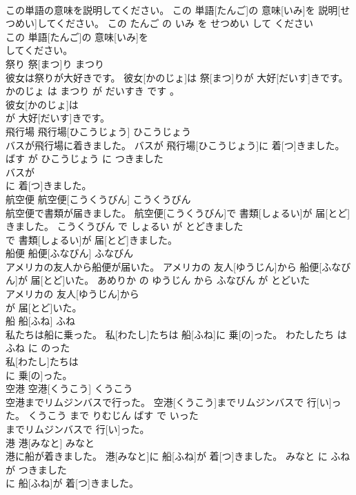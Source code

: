 \documentclass[8pt]{extreport}
\begin{document}
\begin{CJK}{UTF8}{min}
\\	この単語の意味を説明してください。	この 単語[たんご]の 意味[いみ]を 説明[せつめい]してください。	この たんご の いみ を せつめい して ください	
\\	この 単語[たんご]の 意味[いみ]を
\\	してください。			
\\	祭り	祭[まつ]り	まつり	
\\	彼女は祭りが大好きです。	彼女[かのじょ]は 祭[まつ]りが 大好[だいす]きです。	かのじょ は まつり が だいすき です 。	
\\	彼女[かのじょ]は
\\	が 大好[だいす]きです。			
\\	飛行場	飛行場[ひこうじょう]	ひこうじょう	
\\	バスが飛行場に着きました。	バスが 飛行場[ひこうじょう]に 着[つ]きました。	ばす が ひこうじょう に つきました	
\\	バスが
\\	に 着[つ]きました。			
\\	航空便	航空便[こうくうびん]	こうくうびん	
\\	航空便で書類が届きました。	航空便[こうくうびん]で 書類[しょるい]が 届[とど]きました。	こうくうびん で しょるい が とどきました	
\\	で 書類[しょるい]が 届[とど]きました。			
\\	船便	船便[ふなびん]	ふなびん	
\\	アメリカの友人から船便が届いた。	アメリカの 友人[ゆうじん]から 船便[ふなびん]が 届[とど]いた。	あめりか の ゆうじん から ふなびん が とどいた	
\\	アメリカの 友人[ゆうじん]から
\\	が 届[とど]いた。			
\\	船	船[ふね]	ふね	
\\	私たちは船に乗った。	私[わたし]たちは 船[ふね]に 乗[の]った。	わたしたち は ふね に のった	
\\	私[わたし]たちは
\\	に 乗[の]った。			
\\	空港	空港[くうこう]	くうこう	
\\	空港までリムジンバスで行った。	空港[くうこう]までリムジンバスで 行[い]った。	くうこう まで りむじん ばす で いった	
\\	までリムジンバスで 行[い]った。			
\\	港	港[みなと]	みなと	
\\	港に船が着きました。	港[みなと]に 船[ふね]が 着[つ]きました。	みなと に ふね が つきました	
\\	に 船[ふね]が 着[つ]きました。			

\end{CJK}
\end{document}
